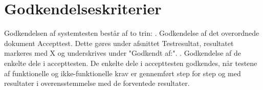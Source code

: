\chapter{Godkendelseskriterier}\label{Godkendelseskriterier}

Godkendelsen af systemtesten består af to trin: 
. Godkendelse af det overordnede dokument Accepttest. Dette gøres under afsnittet Testresultat, resultatet markeres med X og underskrives under "Godkendt af:".
. Godkendelse af de enkelte dele i accepttesten. De enkelte dele i accepttesten godkendes, når testene af funktionelle og ikke-funktionelle krav er gennemført step for step og med resultater
i overensstemmelse med de forventede resultater.